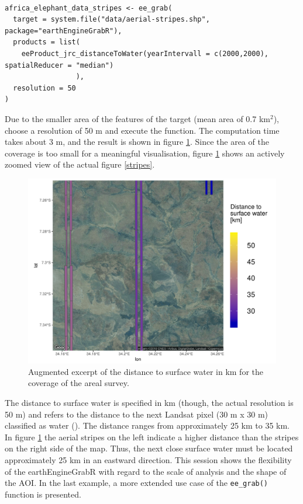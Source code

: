 \begin{lstlisting}

africa_elephant_data_stripes <- ee_grab(
  target = system.file("data/aerial-stripes.shp", package="earthEngineGrabR"), 
  products = list(
    eeProduct_jrc_distanceToWater(yearIntervall = c(2000,2000), spatialReducer = "median")
                 ),
  resolution = 50
)
\end{lstlisting}


Due to the smaller area of the features of the target (mean area of 0.7 km$^2$), choose a resolution of 50 m and execute the function. The computation time takes about 3 m, and the result is shown in figure \ref{session_2}. Since the area of the coverage is too small for a meaningful visualisation, figure \ref{session_2} shows an actively zoomed view of the actual figure \ref{stripes}. 

\begin{center}
	\begin{figure}[h]
		\begin{center}
			\includegraphics[width=15cm]{images/stripes_distance_2.pdf}
			\caption{Augmented excerpt of the distance to surface water in km for the coverage of the areal survey.}
			\label{session_2}
		\end{center}
	\end{figure}
\end{center}

The distance to surface water is specified in km (though, the actual resolution is 50 m) and refers to the distance to the next Landsat pixel (30 m x 30 m) classified as water (\cite{pekel2016high}). The distance ranges from approximately 25 km to 35 km. In figure \ref{session_2} the aerial stripes on the left indicate a higher distance than the stripes on the right side of the map. Thus, the next close surface water must be located approximately 25 km in an eastward direction. This session shows the flexibility of the earthEngineGrabR with regard to the scale of analysis and the shape of the AOI.
In the last example, a more extended use case of the \texttt{ee\_grab()} function is presented.

